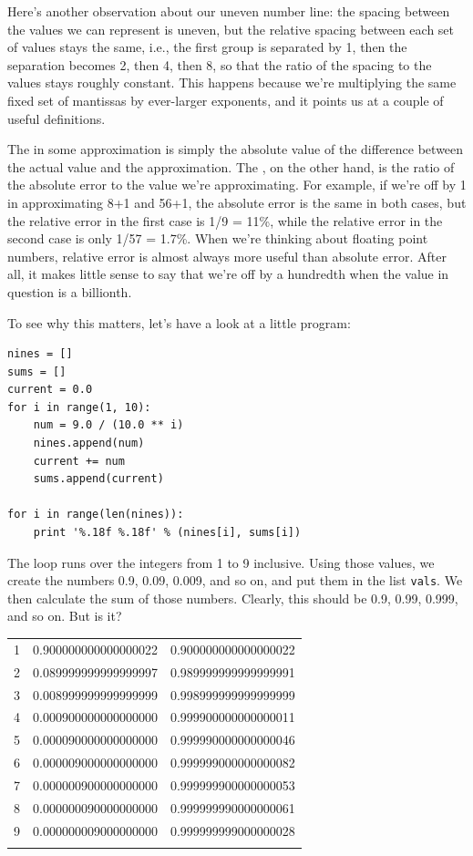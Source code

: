 \documentclass{book}
\begin{document}
Here's another observation about our uneven number line: the spacing
between the values we can represent is uneven, but the relative spacing
between each set of values stays the same, i.e., the first group is
separated by 1, then the separation becomes 2, then 4, then 8, so that
the ratio of the spacing to the values stays roughly constant. This
happens because we're multiplying the same fixed set of mantissas by
ever-larger exponents, and it points us at a couple of useful
definitions.

The  in some approximation is
simply the absolute value of the difference between the actual value and
the approximation. The , on
the other hand, is the ratio of the absolute error to the value we're
approximating. For example, if we're off by 1 in approximating 8+1 and
56+1, the absolute error is the same in both cases, but the relative
error in the first case is 1/9 = 11\%, while the relative error in the
second case is only 1/57 = 1.7\%. When we're thinking about floating
point numbers, relative error is almost always more useful than absolute
error. After all, it makes little sense to say that we're off by a
hundredth when the value in question is a billionth.

To see why this matters, let's have a look at a little program:

\begin{verbatim}
nines = []
sums = []
current = 0.0
for i in range(1, 10):
    num = 9.0 / (10.0 ** i)
    nines.append(num)
    current += num
    sums.append(current)

for i in range(len(nines)):
    print '%.18f %.18f' % (nines[i], sums[i])
\end{verbatim}

The loop runs over the integers from 1 to 9 inclusive. Using those
values, we create the numbers 0.9, 0.09, 0.009, and so on, and put them
in the list \texttt{vals}. We then calculate the sum of those numbers.
Clearly, this should be 0.9, 0.99, 0.999, and so on. But is it?

\begin{tabular}{@{}lll@{}}
\hline\noalign{\medskip}
1 & 0.900000000000000022 & 0.900000000000000022
\\\noalign{\medskip}
2 & 0.089999999999999997 & 0.989999999999999991
\\\noalign{\medskip}
3 & 0.008999999999999999 & 0.998999999999999999
\\\noalign{\medskip}
4 & 0.000900000000000000 & 0.999900000000000011
\\\noalign{\medskip}
5 & 0.000090000000000000 & 0.999990000000000046
\\\noalign{\medskip}
6 & 0.000009000000000000 & 0.999999000000000082
\\\noalign{\medskip}
7 & 0.000000900000000000 & 0.999999900000000053
\\\noalign{\medskip}
8 & 0.000000090000000000 & 0.999999990000000061
\\\noalign{\medskip}
9 & 0.000000009000000000 & 0.999999999000000028
\\\noalign{\medskip}
\hline
\end{tabular}
\end{document}
